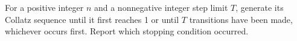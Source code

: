 For a positive integer $n$ and a nonnegative integer step limit $T$, generate its Collatz sequence until it first reaches 1 or until $T$ transitions have been made, whichever occurs first. Report which stopping condition occurred.
